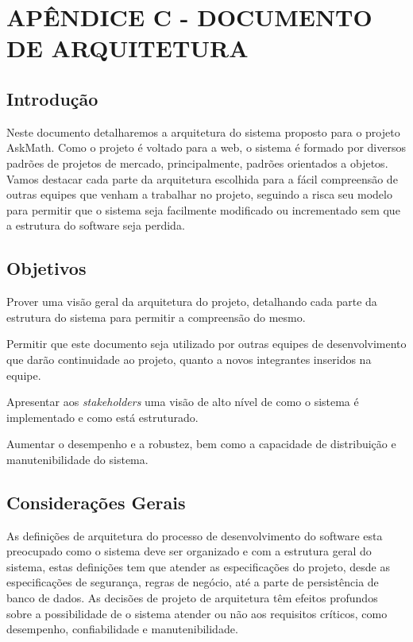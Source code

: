 \chapter*{APÊNDICE C - DOCUMENTO DE ARQUITETURA}\label{apendice_arquitetura}


\section{Introdução}
Neste documento detalharemos a arquitetura do sistema proposto para o projeto 
AskMath. Como o projeto é voltado para a web, o sistema é formado por diversos 
padrões de projetos de mercado, principalmente, padrões orientados a objetos. 
Vamos destacar cada parte da arquitetura escolhida para a fácil compreensão de 
outras equipes que venham a trabalhar no projeto, seguindo a risca seu modelo 
para permitir que o sistema seja facilmente modificado ou incrementado sem que a 
estrutura do software seja perdida.

\section{Objetivos}
\begin{alineascomponto}
	\item Prover uma visão geral da arquitetura do projeto, detalhando cada 
parte da estrutura do sistema para permitir a compreensão do mesmo.
    \item Permitir que este documento seja utilizado por outras equipes de 
desenvolvimento que dar\~ao continuidade ao projeto, quanto a novos 
integrantes inseridos na equipe.
    \item Apresentar aos \textit{stakeholders} uma visão de alto nível de como o 
sistema é implementado e como est\'a estruturado.
    \item Aumentar o desempenho e a robustez, bem como a capacidade de 
distribuição e manutenibilidade do sistema.
\end{alineascomponto}

\section{Considerações Gerais}
As definições de arquitetura do processo de desenvolvimento do software esta 
preocupado como o sistema deve ser organizado e com a estrutura geral do 
sistema, estas definições tem que atender as especificações do projeto, desde as 
especificações de segurança, regras de negócio, até a parte de persistência de 
banco de dados. As decisões de projeto de arquitetura têm efeitos profundos 
sobre a possibilidade de o sistema atender ou não aos requisitos críticos, como 
desempenho, confiabilidade e manutenibilidade.

